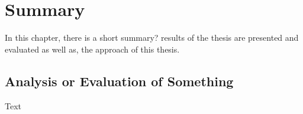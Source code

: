 \documentclass[class=scrbook, crop=false]{standalone}
\begin{document}
\chapter{Summary}
\label{Chapter::Summary}
    In this chapter, there is a short summary? results of the thesis are presented and evaluated as well as, the approach of this thesis.

\section{Analysis or Evaluation of Something}
\label{Section::Short Analysis or Evaluation of Something}    
    Text
\end{document}

